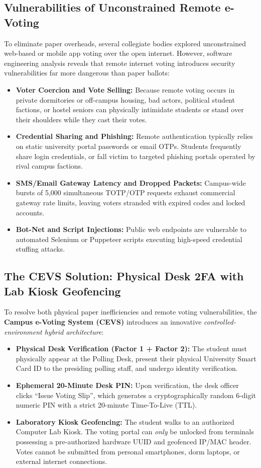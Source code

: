 \documentclass[12pt,a4paper,oneside]{report}
\begin{document}
\subsection{Vulnerabilities of Unconstrained Remote e-Voting}
To eliminate paper overheads, several collegiate bodies explored unconstrained web-based or mobile app voting over the open internet. However, software engineering analysis reveals that remote internet voting introduces security vulnerabilities far more dangerous than paper ballots:
\begin{itemize}
    \item \textbf{Voter Coercion and Vote Selling:} Because remote voting occurs in private dormitories or off-campus housing, bad actors, political student factions, or hostel seniors can physically intimidate students or stand over their shoulders while they cast their votes.
    \item \textbf{Credential Sharing and Phishing:} Remote authentication typically relies on static university portal passwords or email OTPs. Students frequently share login credentials, or fall victim to targeted phishing portals operated by rival campus factions.
    \item \textbf{SMS/Email Gateway Latency and Dropped Packets:} Campus-wide bursts of 5,000 simultaneous TOTP/OTP requests exhaust commercial gateway rate limits, leaving voters stranded with expired codes and locked accounts.
    \item \textbf{Bot-Net and Script Injections:} Public web endpoints are vulnerable to automated Selenium or Puppeteer scripts executing high-speed credential stuffing attacks.
\end{itemize}

\subsection{The CEVS Solution: Physical Desk 2FA with Lab Kiosk Geofencing}
To resolve both physical paper inefficiencies and remote voting vulnerabilities, the \textbf{Campus e-Voting System (CEVS)} introduces an innovative \emph{controlled-environment hybrid architecture}:
\begin{itemize}
    \item \textbf{Physical Desk Verification (Factor 1 + Factor 2):} The student must physically appear at the Polling Desk, present their physical University Smart Card ID to the presiding polling staff, and undergo identity verification.
    \item \textbf{Ephemeral 20-Minute Desk PIN:} Upon verification, the desk officer clicks ``Issue Voting Slip'', which generates a cryptographically random 6-digit numeric PIN with a strict 20-minute Time-To-Live (TTL).
    \item \textbf{Laboratory Kiosk Geofencing:} The student walks to an authorized Computer Lab Kiosk. The voting portal can \emph{only} be unlocked from terminals possessing a pre-authorized hardware UUID and geofenced IP/MAC header. Votes cannot be submitted from personal smartphones, dorm laptops, or external internet connections.
\end{itemize}
\end{document}
